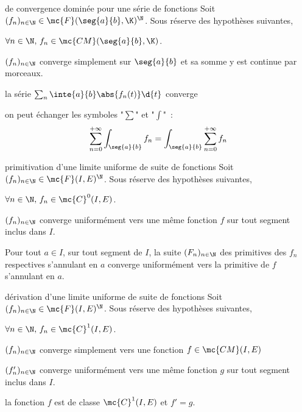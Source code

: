 \begin{adjustwidth}{-3cm}{-3cm}
\begin{theoreme}{10.62}{de convergence dominée pour une série de fonctions}
    Soit $(f_n)_{n \in \N} \in \mc{F}(\seg{a}{b},\K)^\N$. Sous réserve des hypothèses suivantes,
    \begin{enumeratebf}
        \item $\forall n \in \N,\, f_n \in \mc{CM}(\seg{a}{b},\K)$.
        \item $(f_n)_{n \in \N}$ converge simplement sur $\seg{a}{b}$ et sa somme y est continue par morceaux.
        \item la série $\sum_n \inte{a}{b}\abs{f_n(t)}\d{t}$ converge
    \end{enumeratebf}
    on peut échanger les symboles "$\sum$" et "$\int$"~:
    $$\sum_{n=0}^{+\infty} \int_{\seg{a}{b}} f_n = \int_{\seg{a}{b}} \sum_{n=0}^{+\infty} f_n $$
\end{theoreme}

\begin{theoreme}{10.66}{primitivation d'une limite uniforme de suite de fonctions}
    Soit $(f_n)_{n \in \N} \in \mc{F}(I,E)^\N$. Sous réserve des hypothèses suivantes,
    \begin{enumeratebf}
        \item $\forall n \in \N,\, f_n \in \mc{C}^0(I,E)$.
        \item $(f_n)_{n \in \N}$ converge uniformément vers une même fonction $f$ sur tout segment inclus dans $I$.
    \end{enumeratebf}
    Pour tout $a \in I$, sur tout segment de $I$, la suite $(F_n)_{n \in \N}$ des primitives des $f_n$ respectives s'annulant en $a$ converge uniformément vers la primitive de $f$ s'annulant en $a$.
\end{theoreme}

\begin{theoreme}{10.66}{dérivation d'une limite uniforme de suite de fonctions}
    Soit $(f_n)_{n \in \N} \in \mc{F}(I,E)^\N$. Sous réserve des hypothèses suivantes,
    \begin{enumeratebf}
        \item $\forall n \in \N,\, f_n \in \mc{C}^1(I,E)$.
        \item $(f_n)_{n \in \N}$ converge simplement vers une fonction $f \in \mc{CM}(I,E)$
        \item $(f'_n)_{n \in \N}$ converge uniformément vers une même fonction $g$ sur tout segment inclus dans $I$.
    \end{enumeratebf}
    la fonction $f$ est de classe $\mc{C}^1(I,E)$ et $f' = g$.
\end{theoreme}


\end{adjustwidth}
